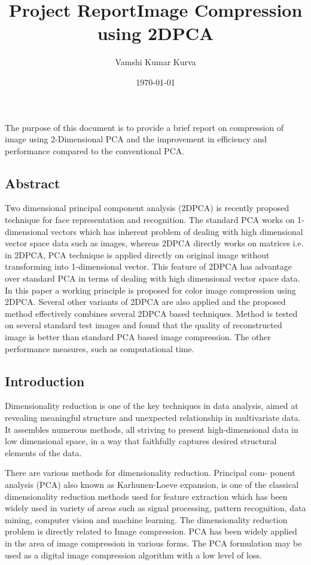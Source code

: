 \documentclass[a4paper, 12pt, notitlepage]{report}
\title{Project Report} %
\title{Image Compression using 2DPCA} %
\author{Vamshi Kumar Kurva} %
\date{\today} %
\begin{document}
\maketitle

\tableofcontents 


\chapter{}
%
The purpose of this document is to provide a brief report on compression of image using 2-Dimensional PCA and the improvement in efficiency and performance compared to the conventional PCA. 

\section{Abstract}
Two dimensional principal component analysis (2DPCA) is recently proposed technique for face representation and recognition. The standard PCA
works on 1-dimensional vectors which has inherent problem of dealing with high dimensional vector space data such as images, whereas 2DPCA directly works on
matrices i.e. in 2DPCA, PCA technique is applied directly on original image without transforming into 1-dimensional vector. This feature of 2DPCA has
advantage over standard PCA in terms of dealing with high dimensional vector space data. In this paper a working principle is proposed for color image
compression using 2DPCA. Several other variants of 2DPCA are also applied and the proposed method effectively combines several 2DPCA based techniques.
Method is tested on several standard test images and found that the quality of reconstructed image is better than standard PCA based image compression. The other performance measures, such as computational time.
\section{Introduction}
Dimensionality reduction is one of the key techniques in data analysis, aimed at revealing meaningful structure and unexpected relationship in multivariate data. It assembles numerous methods, all striving to present high-dimensional data in low dimensional space, in a way that faithfully captures desired structural elements of the data.

There are various methods for dimensionality reduction. Principal com-
ponent analysis (PCA) also known as Karhunen-Loeve expansion, is one of the
classical dimensionality reduction methods used for feature extraction which has been widely used in variety of areas such as signal processing, pattern recognition, data mining, computer vision and machine learning. The dimensionality reduction problem is directly related to Image compression. PCA has been widely applied in the area of image compression in various forms. The PCA formulation may be used as a digital image compression algorithm with a low level of loss.
\end{document}
